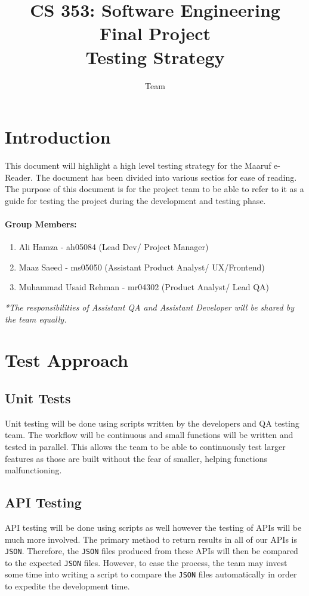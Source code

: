 \documentclass[a4paper, 11pt]{article}
\title{CS 353: Software Engineering \\ {\Large Final Project} \\ {\large Testing Strategy}}
\author{Team \Maaruf}
\begin{document}
\maketitle
\newpage
\tableofcontents
\newpage
\section{Introduction}
This document will highlight a high level testing strategy for the Maaruf e-Reader. The document has been divided into various sectios for ease of reading. The purpose of this document is for the project team to be able to refer to it as a guide for testing the project during the development and testing phase.
\paragraph{Group Members:}
\begin{enumerate}
\item Ali Hamza - ah05084 (Lead Dev/ Project Manager)
\item Maaz Saeed - ms05050 (Assistant Product Analyst/ UX/Frontend)
\item Muhammad Usaid Rehman - mr04302 (Product Analyst/ Lead QA)
\end{enumerate}
\textit{*The responsibilities of Assistant QA and Assistant Developer will be shared by the team equally.}
\section{Test Approach}
\subsection{Unit Tests}
Unit testing will be done using scripts written by the developers and QA testing team. The workflow will be continuous and small functions will be written and tested in parallel. This allows the team to be able to continuously test larger features as those are built without the fear of smaller, helping functions malfunctioning.
\subsection{API Testing}
API testing will be done using scripts as well however the testing of APIs will be much more involved. The primary method to return results in all of our APIs is \texttt{JSON}. Therefore, the \texttt{JSON} files produced from these APIs will then be compared to the expected \texttt{JSON} files. However, to ease the process, the team may invest some time into writing a script to compare the \texttt{JSON} files automatically in order to expedite the development time.
\end{document}
